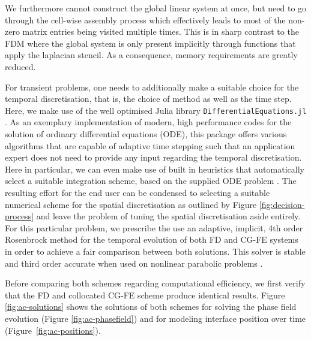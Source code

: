 \documentclass[sn-mathphys,Numbered]{sn-jnl}%
\theoremstyle{thmstyleone}%
\theoremstyle{thmstyletwo}%
\theoremstyle{thmstylethree}%
\begin{document}
We furthermore cannot construct the global linear system at once, but need to go through the cell-wise assembly process which effectively leads to most of the non-zero matrix entries being visited multiple times.
This is in sharp contrast to the FDM where the global system is only present implicitly through functions that apply the laplacian stencil.
As a consequence, memory requirements are greatly reduced.

For transient problems, one needs to additionally make a suitable choice for the temporal discretisation, that is,  the choice of method as well as the time step.
Here, we make use of the well optimised Julia library \texttt{DifferentialEquations.jl} \cite{rackauckas2017differentialequations}.
As an exemplary implementation of modern, high performance codes for the solution of ordinary differential equations (ODE), this package offers various algorithms that are capable of adaptive time stepping such that an application expert does not need to provide any input regarding the temporal discretisation.
Here in particular, we can even make use of built in heuristics that automatically select a suitable integration scheme, based on the supplied ODE problem \cite{rackauckas2019confederated}.
The resulting effort for the end user can be condensed to selecting a suitable numerical scheme for the spatial discretisation as outlined by Figure \ref{fig:decision-process} and leave the problem of tuning the spatial discretisation aside entirely.
For this particular problem, we prescribe the use an adaptive, implicit, 4th order Rosenbrock method for the temporal evolution of both FD and CG-FE systems in order to achieve a fair comparison between both solutions.
This solver is stable and third order accurate when used on nonlinear parabolic problems \cite{rackauckas2017differentialequations}.

Before comparing both schemes regarding computational efficiency, we first verify that the FD and collocated CG-FE scheme produce identical results. Figure \ref{fig:ac-solutions} shows the solutions of both schemes for solving the phase field evolution (Figure \ref{fig:ac-phasefield}) and for modeling interface position over time (Figure~\ref{fig:ac-positions}).
\end{document}
